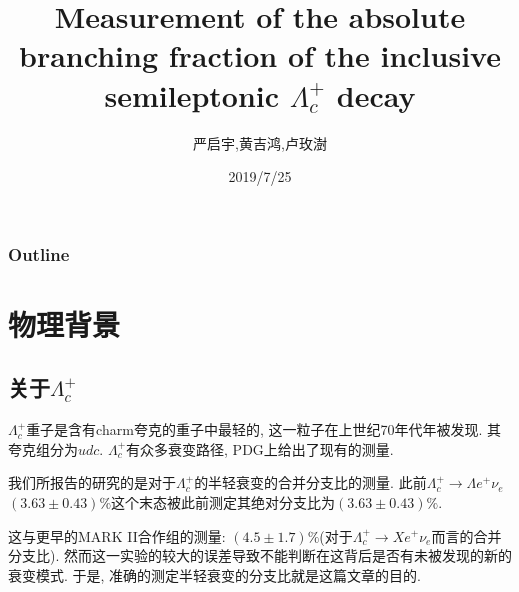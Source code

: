\documentclass{beamer}
\title{Measurement of the absolute branching fraction of the inclusive semileptonic $\Lambda_c^+$ decay}
\author{严启宇,黄吉鸿,卢玫澍}
\institute{UCAS}
\date{2019/7/25}
\begin{document}

\begin{frame}
    \titlepage
\end{frame}

\begin{frame}
    \frametitle{Outline}
    \tableofcontents
\end{frame}

\section{物理背景}
\subsection{关于$\Lambda_c^+$}
\begin{frame}
    \subsectionpage
\end{frame}

\begin{frame}
    $\Lambda_c^+$重子是含有charm夸克的重子中最轻的, 这一粒子在上世纪70年代年被发现.\cite{knapp1976observation}\cite{abrams1980observation} 其夸克组分为$udc$. $\Lambda_c^+$有众多衰变路径, PDG上给出了现有的测量.

\end{frame}
\begin{frame}
    我们所报告的研究\cite{ablikim2018measurement}的是对于$\Lambda_c^+$的半轻衰变的合并分支比的测量. 此前$\Lambda_c^+ \rightarrow \Lambda e^+ \nu_e$  $(3.63 \pm 0.43)\%$这个末态被此前测定其绝对分支比为$(3.63 \pm 0.43)\%$.


    这与更早的MARK II合作组的测量: $(4.5 \pm 1.7)\%$(对于$\Lambda_c^+ \rightarrow X e^+ \nu_e$而言的合并分支比). 然而这一实验的较大的误差导致不能判断在这背后是否有未被发现的新的衰变模式. 于是, 准确的测定半轻衰变的分支比就是这篇文章的目的.
\end{frame}



\begin{frame}[allowframebreaks]
    
\end{frame}
\end{document}
